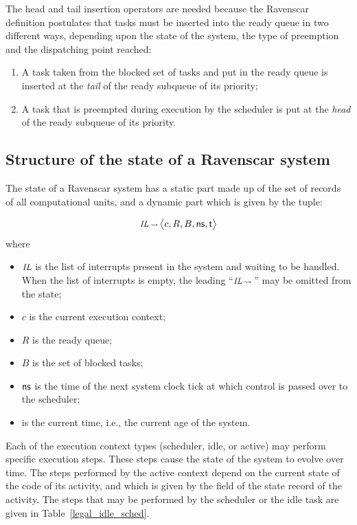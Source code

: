The head and tail insertion operators are needed because the Ravenscar
definition postulates that tasks must be inserted into the ready queue
in two different ways, depending upon the state of the system, the
type of preemption and the dispatching point reached:

\begin{enumerate}
\item{A task taken from the blocked set of tasks and put in the ready
  queue is inserted at the \emph{tail} of the ready subqueue of its
  priority;}
\item{A task that is preempted during execution by the scheduler is
  put at the \emph{head} of the ready subqueue of its priority.}
\end{enumerate}

\subsection{Structure of the state of a Ravenscar system}
The state of a Ravenscar system has a static part made up of the set
of records of all computational units, and a dynamic part which is
given by the tuple:

\begin{equation}
  \text{\small \textit{IL}} \,{\scriptstyle\leadsto}\,
  \big\langle c, R, B, \text{\sffamily ns}, \text{\sffamily t} \big\rangle
\end{equation}
\noindent
where 
\begin{itemize}
  \item{$\text{\small \textit{IL}}$ is the list of interrupts present
    in the system and waiting to be handled. When the list of
    interrupts is empty, the leading ``$\text{\small \textit{IL}}
    \,{\scriptstyle\leadsto}\,$'' may be omitted from the state;}
  \item{$c$ is the current execution context;}
  \item{$R$ is the ready queue;}
  \item{$B$ is the set of blocked tasks;} 
  \item{$\text{\sffamily ns}$ is the time of the next system clock
    tick at which control is passed over to the scheduler;}
  \item{ is the current time, i.e., the current age of the
    system.}
\end{itemize}

Each of the execution context types (scheduler, idle, or active) may
perform specific execution steps. These steps cause the state of the
system to evolve over time. The steps performed by the active context
depend on the current state of the code of its activity, and which is
given by the  field of the state record of the activity. The
steps that may be performed by the scheduler or the idle task are
given in Table~\ref{legal_idle_sched}.

